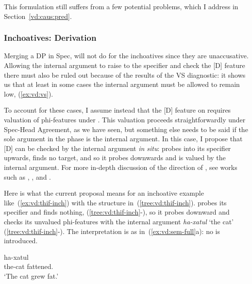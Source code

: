 \begin{exe}
\begin{xlist}
\begin{xlist}
\begin{exe}
\begin{exe}
\begin{xlist}
\begin{exe}
\begin{xlist}
\begin{exe}
\begin{xlist}
\begin{xlist}
\begin{exe}
\begin{xlist}
\begin{exe}
\begin{xlist}
\begin{exe}
\begin{exe}
\begin{exe}
\begin{xlist}
\begin{exe}
\begin{exe}
\begin{xlist}
\begin{xlist}
\begin{exe}
\begin{xlist}
This formulation still suffers from a few potential problems, which I address in Section~\ref{vd:caus:pred}.

		\subsubsection{Inchoatives: Derivation}
Merging a DP in Spec,{\vd} will not do for the inchoatives since they are unaccusative. Allowing the internal argument to raise to the specifier and check the [D] feature there must also be ruled out because of the results of the VS diagnostic: it shows us that at least in some cases the internal argument must be allowed to remain low, (\ref{ex:vd:vs}).

To account for these cases, I assume instead that the [D] feature on {\vd} requires valuation of phi-features under  \citep{nie17,schaefer17oup}. This valuation proceeds straightforwardly under Spec-Head Agreement, as we have seen, but something else needs to be said if the sole argument in the phase is the internal argument. In this case, I propose that [D] can be checked by the internal argument \emph{in situ}: {\vd} probes into its specifier upwards, finds no target, and so it probes downwards and is valued by the internal argument. For more in-depth discussion of the direction of , see works such as \cite{bejarrezac09}, \cite{zeijlstra12}, \cite{preminger13tlr} and \cite{deal15nels}.

Here is what the current proposal means for an inchoative example like~(\ref{ex:vd:thif-inch}) with the structure in~(\ref{tree:vd:thif-inch}). {\vd} probes its specifier and finds nothing, (\ref{tree:vd:thif-inch}-), so it probes downward and checks its unvalued phi-features with the internal argument \emph{ha-xatul} `the cat' (\ref{tree:vd:thif-inch}-). The interpretation is as in~(\ref{ex:vd:sem-full}a): no  is introduced.
 \begin{exe}
\ex \label{ex:vd:thif-inch}  
	{ \gll ha-xatul \\
 	  the-cat fattened.\\
 	\glt `The cat grew fat.' } 
	
 \z 
	

\end{exe}
\end{xlist}
\end{exe}
\end{xlist}
\end{xlist}
\end{exe}
\end{exe}
\end{xlist}
\end{exe}
\end{exe}
\end{exe}
\end{xlist}
\end{exe}
\end{xlist}
\end{exe}
\end{xlist}
\end{xlist}
\end{exe}
\end{xlist}
\end{exe}
\end{xlist}
\end{exe}
\end{exe}
\end{xlist}
\end{xlist}
\end{exe}
